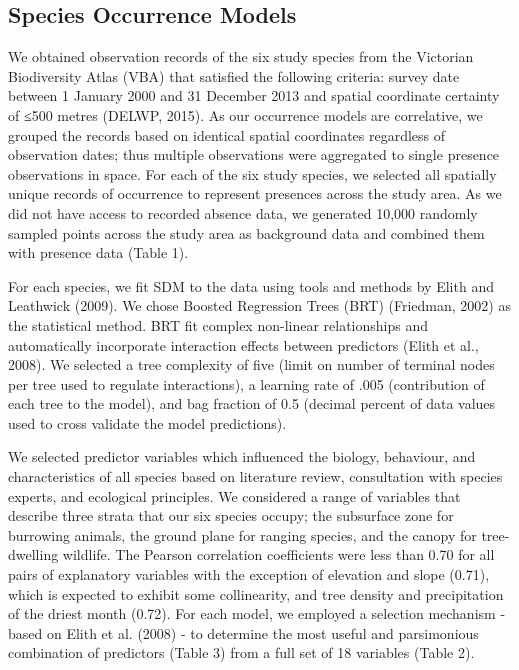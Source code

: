 \subsection{Species Occurrence Models}

We obtained observation records of the six study species from the Victorian Biodiversity Atlas (VBA) that satisfied the following criteria: survey date between 1 January 2000 and 31 December 2013 and spatial coordinate certainty of ≤500 metres (DELWP, 2015).  As our occurrence models are correlative, we grouped the records based on identical spatial coordinates regardless of observation dates; thus multiple observations were aggregated to single presence observations in space. For each of the six study species, we selected all spatially unique records of occurrence to represent presences across the study area. As we did not have access to recorded absence data, we generated 10,000 randomly sampled points across the study area as background data and combined them with presence data (Table 1).

For each species, we fit SDM to the data using tools and methods by Elith and Leathwick (2009). We chose Boosted Regression Trees (BRT) (Friedman, 2002) as the statistical method. BRT fit complex non-linear relationships and automatically incorporate interaction effects between predictors (Elith et al., 2008). We selected a tree complexity of five (limit on number of terminal nodes per tree used to regulate interactions), a learning rate of .005 (contribution of each tree to the model), and bag fraction of 0.5 (decimal percent of data values used to cross validate the model predictions).

We selected predictor variables which influenced the biology, behaviour, and characteristics of all species based on literature review, consultation with species experts, and ecological principles. We considered a range of variables that describe three strata that our six species occupy; the subsurface zone for burrowing animals, the ground plane for ranging species, and the canopy for tree-dwelling wildlife. The Pearson correlation coefficients were less than 0.70 for all pairs of explanatory variables with the exception of elevation and slope (0.71), which is expected to exhibit some collinearity, and tree density and precipitation of the driest month (0.72). For each model, we employed a selection mechanism - based on Elith et al. (2008) - to determine the most useful and parsimonious combination of predictors (Table 3) from a full set of 18 variables (Table 2).

